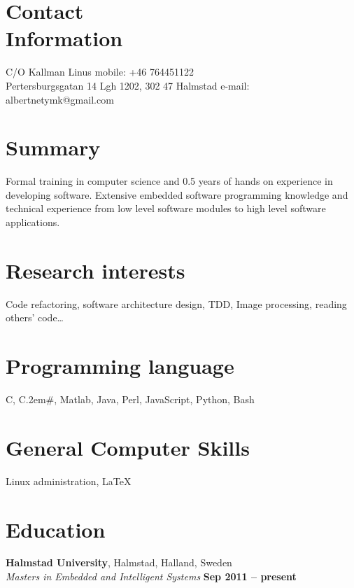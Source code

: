 \documentclass[margin,line]{resume}
\begin{document}
\begin{resume}
	\section{\mysidestyle Contact\\Information}
	C/O Kallman Linus													\hfill mobile: +46 764451122         \vspace{0mm}\\\vspace{0mm}%
	Pertersburgsgatan 14 Lgh 1202, 302 47 Halmstad						\hfill e-mail:  albertnetymk@gmail.com  \vspace{0mm}\\\vspace{-4.5mm}%
	                                                 

	\section{\mysidestyle Summary}
		Formal training in computer science and 0.5 years of hands on experience in developing software.
		Extensive embedded software programming knowledge and technical experience from low level software modules to high level software 
		applications.

	\section{\mysidestyle Research interests} 
		Code refactoring, software architecture design, TDD, Image processing, reading others' code\ldots

	\section{\mysidestyle Programming language} 
	C, C\raise.2em\hbox{{\scriptsize\#}}, Matlab, Java, Perl, JavaScript, Python, Bash

	\section{\mysidestyle General Computer Skills} 
		Linux administration, \LaTeX

	\section{\mysidestyle Education}

		\textbf{Halmstad University}, Halmstad, Halland, Sweden \vspace{2mm}\\\vspace{1mm}%
		\textsl{Masters in Embedded and Intelligent Systems} \hfill \textbf{ Sep 2011 -- present}\vspace{-3mm}\\\vspace{-1mm}%


\end{resume}
\end{document}
